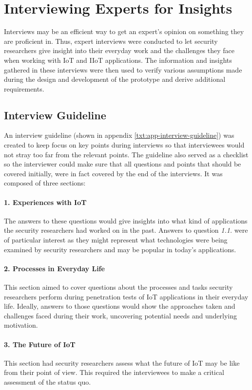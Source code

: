 \section{Interviewing Experts for Insights}
\label{sec:interviews}
Interviews may be an efficient way to get an expert’s opinion on something they are proficient in. Thus, expert interviews were conducted to let security researchers give insight into their everyday work and the challenges they face when working with \ac{IoT} and \ac{IIoT} applications. The information and insights gathered in these interviews were then used to verify various assumptions made during the design and development of the prototype and derive additional requirements.

\subsection{Interview Guideline}
An interview guideline (shown in appendix \ref{txt:app-interview-guideline}) %
was created to keep focus on key points during interviews so that interviewees would not stray too far from the relevant points. The guideline also served as a checklist so the interviewer could make sure that all questions and points that should be covered  initially, were in fact covered by the end of the interviews. It was composed of three sections:

\paragraph{1. Experiences with IoT} The answers to these questions would give insights into what kind of applications the security researchers had worked on in the past. Answers to question \emph{1.1.} were of particular interest as they might represent what technologies were being examined by security researchers and may be popular in today’s applications.
\paragraph{2. Processes in Everyday Life} This section aimed to cover questions about the processes and tasks security researchers perform during penetration tests of IoT applications in their everyday life. Ideally, answers to those questions would show the approaches taken and challenges faced during their work, uncovering potential needs and underlying motivation.
\paragraph{3. The Future of IoT} This section had security researchers assess what the future of IoT may be like from their point of view. This required the interviewees to make a critical assessment of the status quo.


